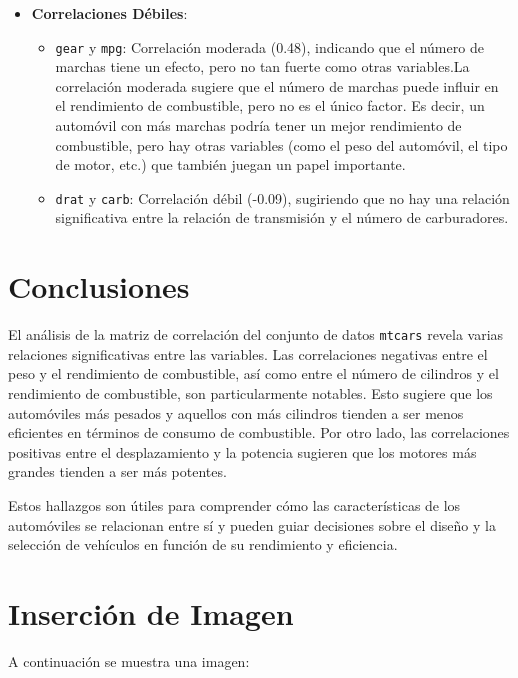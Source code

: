\documentclass{article}
\begin{document}
\begin{itemize}
    \item \textbf{Correlaciones Débiles}:
    \begin{itemize}
        \item \texttt{gear} y \texttt{mpg}: Correlación moderada (0.48), indicando que el número de marchas tiene un efecto, pero no tan fuerte como otras variables.La correlación moderada sugiere que el número de marchas puede influir en el rendimiento de combustible, pero no es el único factor. Es decir, un automóvil con más marchas podría tener un mejor rendimiento de combustible, pero hay otras variables (como el peso del automóvil, el tipo de motor, etc.) que también juegan un papel importante.
        \item \texttt{drat} y \texttt{carb}: Correlación débil (-0.09), sugiriendo que no hay una relación significativa entre la relación de transmisión y el número de carburadores.
    \end{itemize}
\end{itemize}

\section{Conclusiones}
El análisis de la matriz de correlación del conjunto de datos \texttt{mtcars} revela varias relaciones significativas entre las variables. Las correlaciones negativas entre el peso y el rendimiento de combustible, así como entre el número de cilindros y el rendimiento de combustible, son particularmente notables. Esto sugiere que los automóviles más pesados y aquellos con más cilindros tienden a ser menos eficientes en términos de consumo de combustible. Por otro lado, las correlaciones positivas entre el desplazamiento y la potencia sugieren que los motores más grandes tienden a ser más potentes.

Estos hallazgos son útiles para comprender cómo las características de los automóviles se relacionan entre sí y pueden guiar decisiones sobre el diseño y la selección de vehículos en función de su rendimiento y eficiencia.
\section{Inserción de Imagen}
A continuación se muestra una imagen:
\end{document}
